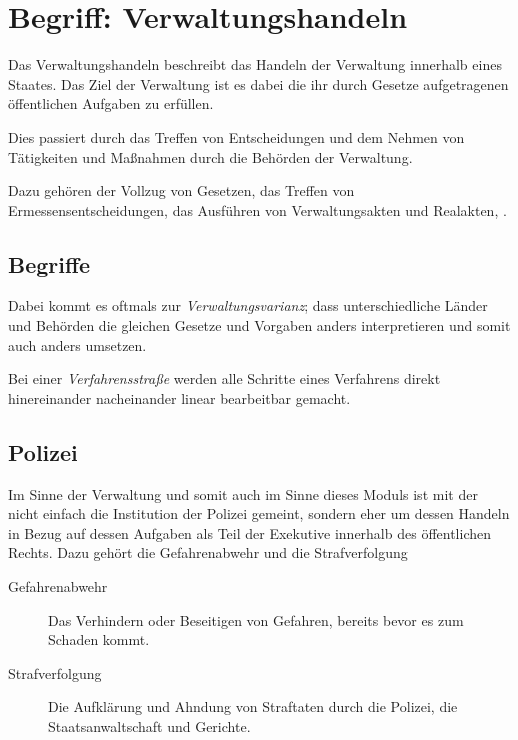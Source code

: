 \documentclass{article}
\begin{document}
\section{Begriff: Verwaltungshandeln} 
Das Verwaltungshandeln beschreibt das Handeln der Verwaltung innerhalb eines Staates. Das Ziel der Verwaltung ist es dabei die ihr durch Gesetze aufgetragenen öffentlichen Aufgaben zu erfüllen.

Dies passiert durch das Treffen von Entscheidungen und dem Nehmen von Tätigkeiten und Maßnahmen durch die Behörden der Verwaltung.

Dazu gehören der Vollzug von Gesetzen, das Treffen von Ermessensentscheidungen, das Ausführen von Verwaltungsakten und Realakten, \usw.

\subsection{Begriffe}
Dabei kommt es oftmals zur \emph{Verwaltungsvarianz}; dass unterschiedliche Länder und Behörden die gleichen Gesetze und Vorgaben anders interpretieren und somit auch anders umsetzen.

Bei einer \emph{Verfahrensstraße} werden alle Schritte eines Verfahrens direkt hinereinander nacheinander linear bearbeitbar gemacht.

\subsection{Polizei}
Im Sinne der Verwaltung und somit auch im Sinne dieses Moduls ist mit der  nicht einfach die Institution der Polizei gemeint, sondern eher um dessen Handeln in Bezug auf dessen Aufgaben als Teil der Exekutive innerhalb des öffentlichen Rechts. Dazu gehört die Gefahrenabwehr und die Strafverfolgung
\begin{description}
 \item[Gefahrenabwehr] Das Verhindern oder Beseitigen von Gefahren, bereits bevor es zum Schaden kommt. 
 \item[Strafverfolgung] Die Aufklärung und Ahndung von Straftaten durch die Polizei, die Staatsanwaltschaft und Gerichte.
\end{description}
\end{document}
